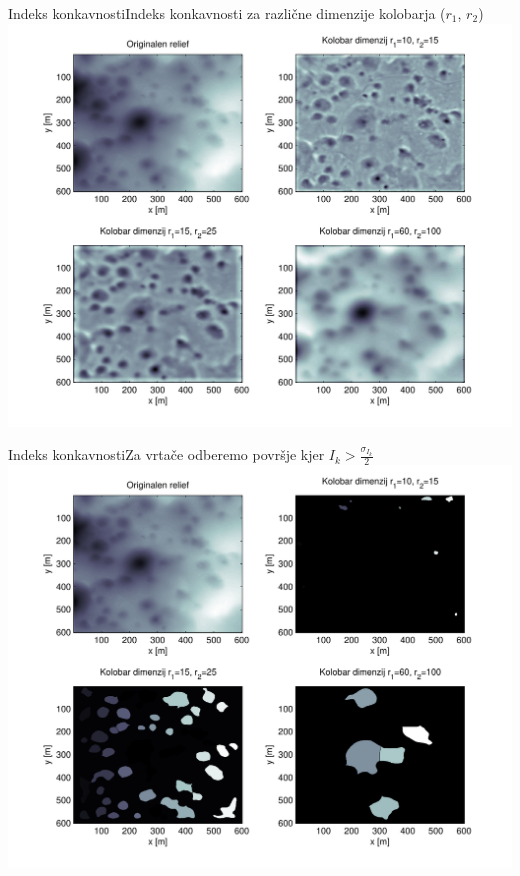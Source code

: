 \documentclass{beamer}
\begin{document}
\begin{frame}{Indeks konkavnosti}{Indeks konkavnosti za različne dimenzije kolobarja ($r_1$, $r_2$)}
    \includegraphics[width=\textwidth]{slike/concavity-samples}
\end{frame}

\begin{frame}{Indeks konkavnosti}{Za vrtače odberemo površje kjer $I_k > \frac{\sigma_{I_k}}{2}$}
    \includegraphics[width=\textwidth]{slike/concavity-segmentation-samples}
\end{frame}
\end{document}
